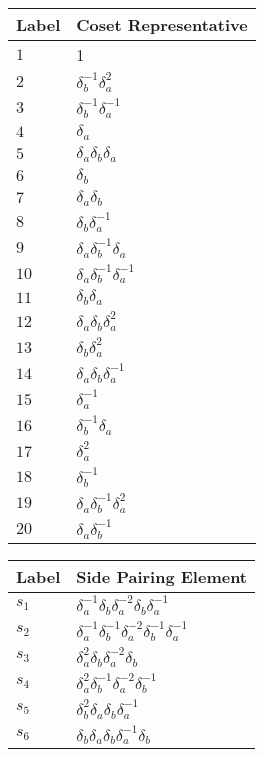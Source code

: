 \documentclass{article}
\begin{document}
\begin{center}
\begin{tabular}{ll}
\toprule
Label & Coset Representative\\
\midrule
$1$ & 1 \\
$2$ & $\delta_b^{-1}\delta_a^{2}$ \\
$3$ & $\delta_b^{-1}\delta_a^{-1}$ \\
$4$ & $\delta_a^{}$ \\
$5$ & $\delta_a^{}\delta_b^{}\delta_a^{}$ \\
$6$ & $\delta_b^{}$ \\
$7$ & $\delta_a^{}\delta_b^{}$ \\
$8$ & $\delta_b^{}\delta_a^{-1}$ \\
$9$ & $\delta_a^{}\delta_b^{-1}\delta_a^{}$ \\
$10$ & $\delta_a^{}\delta_b^{-1}\delta_a^{-1}$ \\
$11$ & $\delta_b^{}\delta_a^{}$ \\
$12$ & $\delta_a^{}\delta_b^{}\delta_a^{2}$ \\
$13$ & $\delta_b^{}\delta_a^{2}$ \\
$14$ & $\delta_a^{}\delta_b^{}\delta_a^{-1}$ \\
$15$ & $\delta_a^{-1}$ \\
$16$ & $\delta_b^{-1}\delta_a^{}$ \\
$17$ & $\delta_a^{2}$ \\
$18$ & $\delta_b^{-1}$ \\
$19$ & $\delta_a^{}\delta_b^{-1}\delta_a^{2}$ \\
$20$ & $\delta_a^{}\delta_b^{-1}$ \\
\bottomrule
\end{tabular}
\hfill
\begin{tabular}{ll}
\toprule
Label & Side Pairing Element\\
\midrule
$s_{1}$ & $\delta_a^{-1}\delta_b^{}\delta_a^{-2}\delta_b^{}\delta_a^{-1}$ \\
$s_{2}$ & $\delta_a^{-1}\delta_b^{-1}\delta_a^{-2}\delta_b^{-1}\delta_a^{-1}$ \\
$s_{3}$ & $\delta_a^{2}\delta_b^{}\delta_a^{-2}\delta_b^{}$ \\
$s_{4}$ & $\delta_a^{2}\delta_b^{-1}\delta_a^{-2}\delta_b^{-1}$ \\
$s_{5}$ & $\delta_b^{2}\delta_a^{}\delta_b^{}\delta_a^{-1}$ \\
$s_{6}$ & $\delta_b^{}\delta_a^{}\delta_b^{}\delta_a^{-1}\delta_b^{}$ \\

\end{tabular}
\end{center}
\end{document}
